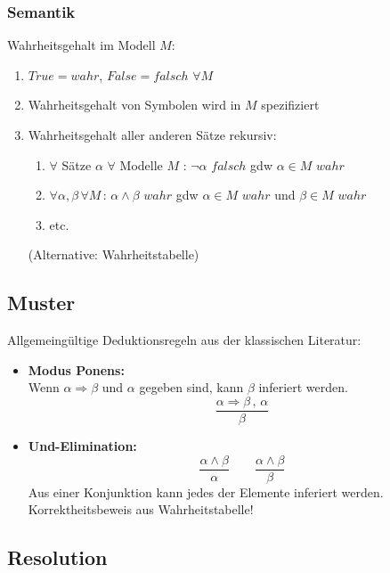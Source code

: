 \subsubsection*{Semantik}
Wahrheitsgehalt im Modell $M$:
\begin{enumerate}
\item $True = wahr$, $False = falsch$ $\forall M$
\item Wahrheitsgehalt von Symbolen wird in $M$ spezifiziert
\item Wahrheitsgehalt aller anderen Sätze rekursiv:
\begin{enumerate}
\item $\forall$ Sätze $\alpha$ $\forall$ Modelle $M$ : $\neg \alpha$ $falsch$ gdw $\alpha \in M$ $wahr$
\item $\forall \alpha,\beta \, \forall M \, : \, \alpha \wedge \beta \,\, wahr$ gdw $\alpha \in M \,\, wahr$ und $\beta \in M \,\, wahr$
\item etc.
\end{enumerate}
(Alternative: Wahrheitstabelle)
\end{enumerate}

\subsection{Muster}

Allgemeingültige Deduktionsregeln aus der klassischen Literatur:
\begin{itemize}
\item \textbf{Modus Ponens:} \\ Wenn $\alpha \Rightarrow \beta$ und $\alpha$ gegeben sind, kann $\beta$ inferiert werden. $$\frac{\alpha \Rightarrow \beta \, , \, \alpha}{\beta}$$
\item \textbf{Und-Elimination:} $$\frac{\alpha \wedge \beta}{\alpha} \qquad \frac{\alpha \wedge \beta}{\beta}$$ Aus einer Konjunktion kann jedes der Elemente inferiert werden. \\ Korrektheitsbeweis aus Wahrheitstabelle!
\end{itemize}

\subsection{Resolution}


